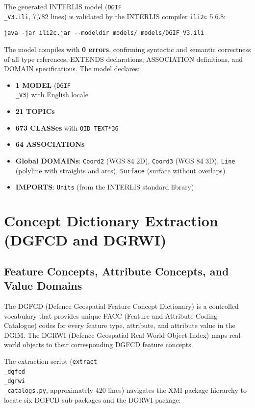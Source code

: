 \documentclass[conference]{IEEEtran}
\begin{document}
The generated INTERLIS model (\texttt{DGIF\\_V3.ili}, 7,782 lines) is validated by the INTERLIS compiler \texttt{ili2c} 5.6.8:

\begin{lstlisting}
java -jar ili2c.jar --modeldir models/ models/DGIF_V3.ili
\end{lstlisting}


The model compiles with \textbf{0 errors}, confirming syntactic and semantic correctness of all type references, EXTENDS declarations, ASSOCIATION definitions, and DOMAIN specifications. The model declares:

\begin{itemize}[leftmargin=*]
\item \textbf{1 MODEL} (\texttt{DGIF\\_V3}) with English locale
\item \textbf{21 TOPICs}
\item \textbf{673 CLASSes} with \texttt{OID TEXT*36}
\item \textbf{64 ASSOCIATIONs}
\item \textbf{Global DOMAINs}: \texttt{Coord2} (WGS 84 2D), \texttt{Coord3} (WGS 84 3D), \texttt{Line} (polyline with straights and arcs), \texttt{Surface} (surface without overlaps)
\item \textbf{IMPORTS}: \texttt{Units} (from the INTERLIS standard library)
\end{itemize}



\section{Concept Dictionary Extraction (DGFCD and DGRWI)}

\subsection{Feature Concepts, Attribute Concepts, and Value Domains}

The DGFCD (Defence Geospatial Feature Concept Dictionary) is a controlled vocabulary that provides unique FACC (Feature and Attribute Coding Catalogue) codes for every feature type, attribute, and attribute value in the DGIM. The DGRWI (Defence Geospatial Real World Object Index) maps real-world objects to their corresponding DGFCD feature concepts.

The extraction script (\texttt{extract\\_dgfcd\\_dgrwi\\_catalogs.py}, approximately 420 lines) navigates the XMI package hierarchy to locate six DGFCD sub-packages and the DGRWI package:
\end{document}
